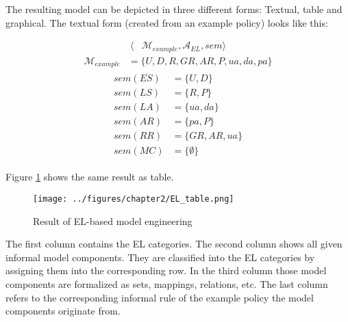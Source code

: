 \documentclass[twoside, openright, 12pt]{book}
\begin{document}


\noindent
The resulting model can be depicted in three different forms: Textual, table and graphical.
The textual form (created from an example policy) looks like this:

\begin{align}
\langle &\mathcal{M}_{\mathit{example}}, \mathcal{A}_{EL}, sem \rangle
\label{EL_Aspect}
\end{align}
\begin{align}
\mathcal{M}_{\mathit{example}} &= \lbrace U, D, R, \mathit{GR}, \mathit{AR}, P, \mathit{ua}, \mathit{da}, \mathit{pa} \rbrace
\label{EL_M}
\end{align}
\begin{align}
\begin{split}
sem(\mathit{ES}) &= \lbrace U, D \rbrace\\
sem(\mathit{LS}) &= \lbrace R, P \rbrace\\
sem(\mathit{LA}) &= \lbrace \mathit{ua}, \mathit{da} \rbrace\\
sem(\mathit{AR}) &= \lbrace \mathit{pa}, P \rbrace\\
sem(\mathit{RR}) &= \lbrace \mathit{GR}, \mathit{AR}, \mathit{ua} \rbrace\\
sem(\mathit{MC}) &= \lbrace \emptyset \rbrace
\end{split}
\label{EL_sem}
\end{align}

\noindent
Figure \ref{fig:EL_table} shows the same result as table.

\begin{figure}[htb]
	\centering
	\texttt{[image: ../figures/chapter2/EL\_table.png]}
	\caption{Result of EL-based model engineering \cite[p.77, table 4.1]{Amthor18}}
	\label{fig:EL_table}
\end{figure}

\noindent
The first column contains the EL categories.
The second column shows all given informal model components.
They are classified into the EL categories by assigning them into the corresponding row.
In the third column those model components are formalized as sets, mappings, relations, etc.
The last column refers to the corresponding informal rule of the example policy the model components originate from.
\end{document}

